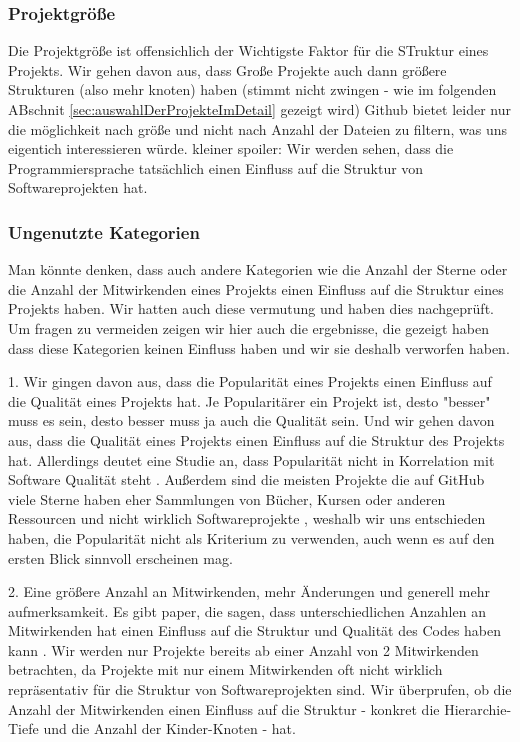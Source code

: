 \subsubsection*{Projektgröße} Die Projektgröße ist offensichlich der Wichtigste Faktor für die STruktur eines Projekts. Wir gehen davon aus, dass Große Projekte auch dann größere Strukturen (also mehr knoten) haben (stimmt nicht zwingen - wie im folgenden ABschnit \ref{sec:auswahlDerProjekteImDetail} gezeigt wird) Github bietet leider nur die möglichkeit nach größe und nicht nach Anzahl der Dateien zu filtern, was uns eigentich interessieren würde. 
kleiner spoiler: Wir werden sehen, dass die Programmiersprache tatsächlich einen Einfluss auf die Struktur von Softwareprojekten hat.

\subsubsection*{Ungenutzte Kategorien}
Man könnte denken, dass auch andere Kategorien wie die Anzahl der Sterne oder die Anzahl der Mitwirkenden eines Projekts einen Einfluss auf die Struktur eines Projekts haben. Wir hatten auch diese vermutung und haben dies nachgeprüft. Um fragen zu vermeiden zeigen wir hier auch die ergebnisse, die gezeigt haben dass diese Kategorien keinen Einfluss haben und wir sie deshalb verworfen haben.

1. Wir gingen davon aus, dass die Popularität eines Projekts einen Einfluss auf die Qualität eines Projekts hat. Je Popularitärer ein Projekt ist, desto "besser" muss es sein, desto besser muss ja auch die Qualität sein. Und wir gehen davon aus, dass die Qualität eines Projekts einen Einfluss auf die Struktur des Projekts hat. Allerdings deutet eine Studie an, dass Popularität nicht in Korrelation mit Software Qualität steht \cite{popAndQuality}. Außerdem sind die meisten Projekte die auf GitHub viele Sterne haben eher Sammlungen von Bücher, Kursen oder anderen Ressourcen und nicht wirklich Softwareprojekte \cite{evanli_github-ranking_2025}, weshalb wir uns entschieden haben, die Popularität nicht als Kriterium zu verwenden, auch wenn es auf den ersten Blick sinnvoll erscheinen mag.

2. Eine größere Anzahl an Mitwirkenden, mehr Änderungen und generell mehr aufmerksamkeit. 
Es gibt paper, die sagen, dass unterschiedlichen Anzahlen an Mitwirkenden hat einen Einfluss auf die Struktur und Qualität des Codes haben kann \cite{numDevs}. Wir werden nur Projekte bereits ab einer Anzahl von 2 Mitwirkenden betrachten, da Projekte mit nur einem Mitwirkenden oft nicht wirklich repräsentativ für die Struktur von Softwareprojekten sind. 
Wir überprufen, ob die Anzahl der Mitwirkenden einen Einfluss auf die Struktur - konkret die Hierarchie-Tiefe und die Anzahl der Kinder-Knoten - hat.

